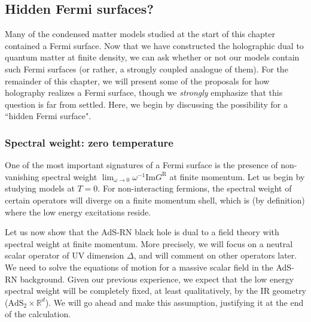 \documentclass[10pt, oneside]{book}
\begin{document}
\begin{doublespace}
\subsection{Hidden Fermi surfaces?}
Many of the condensed matter models studied at the start of this chapter contained a Fermi surface.  Now that we have constructed  the holographic dual to quantum matter at finite density, we can ask whether or not our models contain  such Fermi surfaces (or rather, a strongly coupled analogue of them).   For the remainder of this chapter, we will present some of the proposals for how holography realizes a Fermi surface, though we \emph{strongly} emphasize that this question is far from settled.  Here, we begin by discussing the possibility for a ``hidden Fermi surface".  

\subsubsection{Spectral weight: zero temperature}
One of the most important signatures of a Fermi surface is the presence of non-vanishing spectral weight $\lim_{\omega \rightarrow 0} \omega^{-1}\mathrm{Im} G^{\mathrm{R}}$ at finite momentum.   Let us begin by studying models at $T=0$.  For non-interacting fermions, the spectral weight of certain operators will diverge on a finite momentum shell, which is (by definition) where the low energy excitations reside.   

Let us now show that the AdS-RN black hole is dual to a field theory with spectral weight at finite momentum.   More precisely, we will focus on a neutral scalar operator of UV dimension $\Delta$, and will comment on other operators later.    We need to solve the equations of motion for a massive scalar field in the AdS-RN background.     Given our previous experience, we expect that the low energy spectral weight will be completely fixed, at least qualitatively, by the IR geometry ($\mathrm{AdS}_2 \times \mathbb{R}^d$).  We will go ahead and make this assumption, justifying it at the end of the calculation.


\end{doublespace}
\end{document}
